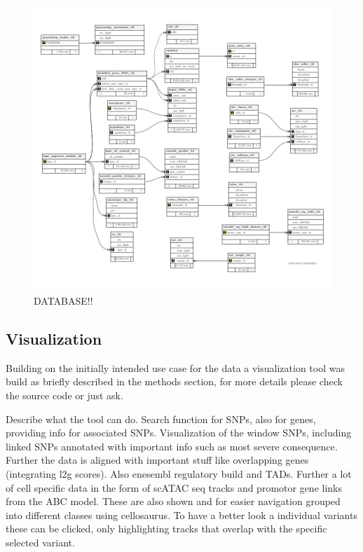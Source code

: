     \begin{figure}[h]
    \capstart
        \centering
    	\includegraphics{Abbildung/db-schema.pdf}

    	\begin{minipage}{\captionwidth}
    		\caption[database]{ \newline DATABASE!!}
    		\label{fig:db}
    	\end{minipage}
    \end{figure}

    \subsection{Visualization}
    \label{subsec:result_vis}
    Building on the initially intended use case for the data a visualization tool was build as briefly described in the methods section, for more details please check the source code or just ask.

    Describe what the tool can do. Search function for SNPs, also for genes, providing info for associated SNPs. Visualization of the window SNPs, including linked SNPs annotated with important info such as most severe consequence. Further the data is aligned with important stuff like overlapping genes (integrating l2g scores). Also enesembl regulatory build and TADs. Further a lot of cell specific data in the form of scATAC seq tracks and promotor gene links from the ABC model. These are also shown and for easier navigation grouped into different classes using cellosaurus. To have a better look a individual variants these can be clicked, only highlighting tracks that overlap with the specific selected variant.

